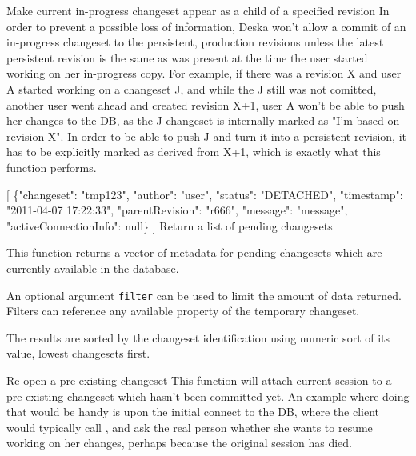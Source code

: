 \documentclass{article}
\begin{document}
    {}
    {Make current in-progress changeset appear as a child of a specified revision}
    {In order to prevent a possible loss of information, Deska won't allow a commit of an in-progress changeset to the
    persistent, production revisions unless the latest persistent revision is the same as was present at the time the
    user started working on her in-progress copy. For example, if there was a revision X and user A started working on a
    changeset J, and while the J still was not comitted, another user went ahead and created revision X+1, user A won't
    be able to push her changes to the DB, as the J changeset is internally marked as "I'm based on revision X". In
    order to be able to push J and turn it into a persistent revision, it has to be explicitly marked as derived from
    X+1, which is exactly what this function performs.}

    {[
     \{"changeset": "tmp123", "author": "user", "status": "DETACHED", "timestamp": "2011-04-07 17:22:33",
     "parentRevision": "r666", "message": "message", \\ "activeConnectionInfo": null\}
    ]}
    {Return a list of pending changesets}
    {This function returns a vector of metadata for pending changesets which are currently available in the
    database.

    An optional argument {\tt filter} can be used to limit the amount of data returned.  Filters can reference any
    available property of the temporary changeset.

    The results are sorted by the changeset identification using numeric sort of its value, lowest changesets first.}

    {}
    {Re-open a pre-existing changeset}
    {This function will attach current session to a pre-existing changeset which hasn't been committed yet. An example
    where doing that would be handy is upon the initial connect to the DB, where the client would typically call
    , and ask the real person whether she wants to resume working on her changes,
    perhaps because the original session has died.}
\end{document}
